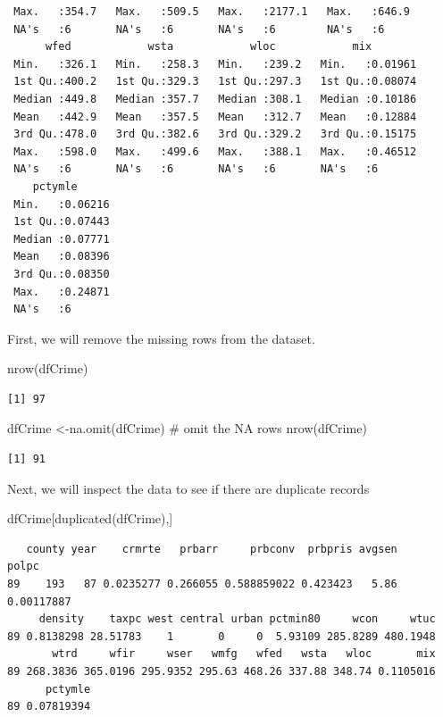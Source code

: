 \documentclass[]{article}
\newenvironment{Shaded}{}{}
\newcommand{\CommentTok}[1]{\textcolor[rgb]{0.00,0.50,0.00}{#1}}
\newcommand{\KeywordTok}[1]{\textcolor[rgb]{0.00,0.00,1.00}{#1}}
\newcommand{\NormalTok}[1]{#1}
\begin{document}
\begin{verbatim}
 Max.   :354.7   Max.   :509.5   Max.   :2177.1   Max.   :646.9  
 NA's   :6       NA's   :6       NA's   :6        NA's   :6      
      wfed            wsta            wloc            mix         
 Min.   :326.1   Min.   :258.3   Min.   :239.2   Min.   :0.01961  
 1st Qu.:400.2   1st Qu.:329.3   1st Qu.:297.3   1st Qu.:0.08074  
 Median :449.8   Median :357.7   Median :308.1   Median :0.10186  
 Mean   :442.9   Mean   :357.5   Mean   :312.7   Mean   :0.12884  
 3rd Qu.:478.0   3rd Qu.:382.6   3rd Qu.:329.2   3rd Qu.:0.15175  
 Max.   :598.0   Max.   :499.6   Max.   :388.1   Max.   :0.46512  
 NA's   :6       NA's   :6       NA's   :6       NA's   :6        
    pctymle       
 Min.   :0.06216  
 1st Qu.:0.07443  
 Median :0.07771  
 Mean   :0.08396  
 3rd Qu.:0.08350  
 Max.   :0.24871  
 NA's   :6        
\end{verbatim}

First, we will remove the missing rows from the dataset.

\begin{Shaded}
\begin{Highlighting}[]
\KeywordTok{nrow}\NormalTok{(dfCrime)}
\end{Highlighting}
\end{Shaded}

\begin{verbatim}
[1] 97
\end{verbatim}

\begin{Shaded}
\begin{Highlighting}[]
\NormalTok{dfCrime <-}\KeywordTok{na.omit}\NormalTok{(dfCrime) }\CommentTok{# omit the NA rows}
\KeywordTok{nrow}\NormalTok{(dfCrime)}
\end{Highlighting}
\end{Shaded}

\begin{verbatim}
[1] 91
\end{verbatim}

Next, we will inspect the data to see if there are duplicate records

\begin{Shaded}
\begin{Highlighting}[]
\NormalTok{dfCrime[}\KeywordTok{duplicated}\NormalTok{(dfCrime),]}
\end{Highlighting}
\end{Shaded}

\begin{verbatim}
   county year    crmrte   prbarr     prbconv  prbpris avgsen      polpc
89    193   87 0.0235277 0.266055 0.588859022 0.423423   5.86 0.00117887
     density    taxpc west central urban pctmin80     wcon     wtuc
89 0.8138298 28.51783    1       0     0  5.93109 285.8289 480.1948
       wtrd     wfir     wser   wmfg   wfed   wsta   wloc       mix
89 268.3836 365.0196 295.9352 295.63 468.26 337.88 348.74 0.1105016
      pctymle
89 0.07819394
\end{verbatim}
\end{document}
